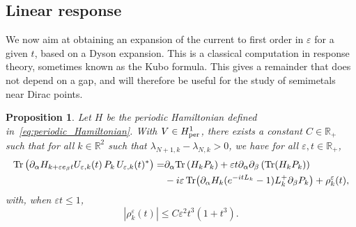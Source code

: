\documentclass[a4paper,11pt]{article}
\theoremstyle{plain}
\newtheorem{proposition}[theorem]{Proposition}
\theoremstyle{remark}
\def\R{{\mathbb R}}
\def\eps{{\varepsilon}}
\begin{document}
\subsection{Linear response}
\label{subsec:lr}

We now aim at obtaining an expansion of the current to first order in
$\eps$ for a given $t$, based on a Dyson expansion.
This is a classical computation in response theory, sometimes known
as the Kubo formula. This gives
a remainder that does not depend on a gap, and will therefore be
useful for the study of semimetals near Dirac points.
\begin{proposition}\label{prop:Dyson}  Let $H$ be the periodic Hamiltonian defined in~\eqref{eq:periodic_Hamiltonian}. With $V\in H^1_{\rm per}$, there exists a constant $C \in \R_+$ such that for all $k \in \R^2$ such that $\lambda_{N+1,k}-\lambda_{N,k} > 0$, we have for all $\eps,t \in \R_+$,
\begin{align}
 {\rm Tr} \left(\partial_\alpha H_{k+\eps e_\beta t}U_{\eps,k}(t)\, P_k\, U_{\eps,k}(t)^*\right) =& \partial_\alpha {\rm Tr} \left(H_k P_k\right) + \eps t  {\partial_\alpha\partial_\beta} \left( \Tr (H_k P_k) \right) \nonumber  \\ & - i \eps \Tr(\partial_\alpha H_k (e^{-i t L_k} - 1) L_{k}^{+}  \partial_\beta P_k) + \rho^\eps_k(t),
\end{align}
with, when $\eps t \le 1$,
\begin{equation}\label{eq:boundrho}
|\rho^\eps_k(t)| \le C \eps^2 t^3 (1+ t^3 ).
\end{equation}
\end{proposition}
\end{document}
